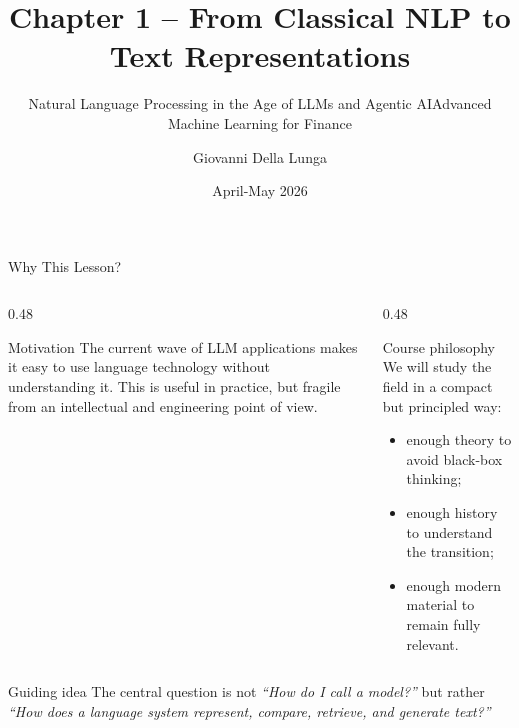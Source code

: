 \documentclass[aspectratio=169]{beamer}
\title{Chapter 1 -- From Classical NLP to Text Representations}
\subtitle{Natural Language Processing in the Age of LLMs and Agentic AI}
\subtitle{Advanced Machine Learning for Finance}
\author{Giovanni Della Lunga}
\institute{University of Bologna}
\date{April-May 2026}
\begin{document}
%
%
\begin{frame}
    \titlepage
\end{frame}
%
%
\begin{frame}{Why This Lesson?}
\small
\begin{columns}[T]
\begin{column}{0.48\textwidth}
\begin{block}{Motivation}
The current wave of LLM applications makes it easy to use language technology without understanding it. This is useful in practice, but fragile from an intellectual and engineering point of view.
\end{block}
\end{column}
\begin{column}{0.48\textwidth}
\begin{block}{Course philosophy}
We will study the field in a compact but principled way:
\begin{itemize}
    \item enough theory to avoid black-box thinking;
    \item enough history to understand the transition;
    \item enough modern material to remain fully relevant.
\end{itemize}
\end{block}
\end{column}
\end{columns}

\vspace{0.12cm}
\begin{alertblock}{Guiding idea}
The central question is not \emph{``How do I call a model?''} but rather \emph{``How does a language system represent, compare, retrieve, and generate text?''}
\end{alertblock}
\end{frame}
%
%
\end{document}
